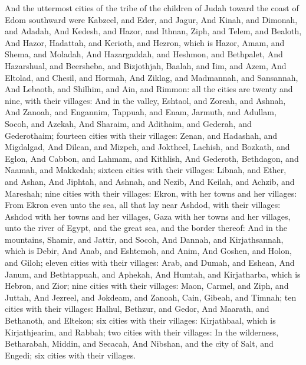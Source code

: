 \Verse And the uttermost cities of the tribe of the children of Judah toward the coast of Edom southward were Kabzeel, and Eder, and Jagur, \Verse And Kinah, and Dimonah, and Adadah, \Verse And Kedesh, and Hazor, and Ithnan, \Verse Ziph, and Telem, and Bealoth, \Verse And Hazor, Hadattah, and Kerioth, and Hezron, which is Hazor, \Verse Amam, and Shema, and Moladah, \Verse And Hazargaddah, and Heshmon, and Bethpalet, \Verse And Hazarshual, and Beersheba, and Bizjothjah, \Verse Baalah, and Iim, and Azem, \Verse And Eltolad, and Chesil, and Hormah, \Verse And Ziklag, and Madmannah, and Sansannah, \Verse And Lebaoth, and Shilhim, and Ain, and Rimmon: all the cities are twenty and nine, with their villages: \Verse And in the valley, Eshtaol, and Zoreah, and Ashnah, \Verse And Zanoah, and Engannim, Tappuah, and Enam, \Verse Jarmuth, and Adullam, Socoh, and Azekah, \Verse And Sharaim, and Adithaim, and Gederah, and Gederothaim; fourteen cities with their villages: \Verse Zenan, and Hadashah, and Migdalgad, \Verse And Dilean, and Mizpeh, and Joktheel, \Verse Lachish, and Bozkath, and Eglon, \Verse And Cabbon, and Lahmam, and Kithlish, \Verse And Gederoth, Bethdagon, and Naamah, and Makkedah; sixteen cities with their villages: \Verse Libnah, and Ether, and Ashan, \Verse And Jiphtah, and Ashnah, and Nezib, \Verse And Keilah, and Achzib, and Mareshah; nine cities with their villages: \Verse Ekron, with her towns and her villages: \Verse From Ekron even unto the sea, all that lay near Ashdod, with their villages: \Verse Ashdod with her towns and her villages, Gaza with her towns and her villages, unto the river of Egypt, and the great sea, and the border thereof: \Verse And in the mountains, Shamir, and Jattir, and Socoh, \Verse And Dannah, and Kirjathsannah, which is Debir, \Verse And Anab, and Eshtemoh, and Anim, \Verse And Goshen, and Holon, and Giloh; eleven cities with their villages: \Verse Arab, and Dumah, and Eshean, \Verse And Janum, and Bethtappuah, and Aphekah, \Verse And Humtah, and Kirjatharba, which is Hebron, and Zior; nine cities with their villages: \Verse Maon, Carmel, and Ziph, and Juttah, \Verse And Jezreel, and Jokdeam, and Zanoah, \Verse Cain, Gibeah, and Timnah; ten cities with their villages: \Verse Halhul, Bethzur, and Gedor, \Verse And Maarath, and Bethanoth, and Eltekon; six cities with their villages: \Verse Kirjathbaal, which is Kirjathjearim, and Rabbah; two cities with their villages: \Verse In the wilderness, Betharabah, Middin, and Secacah, \Verse And Nibshan, and the city of Salt, and Engedi; six cities with their villages.

